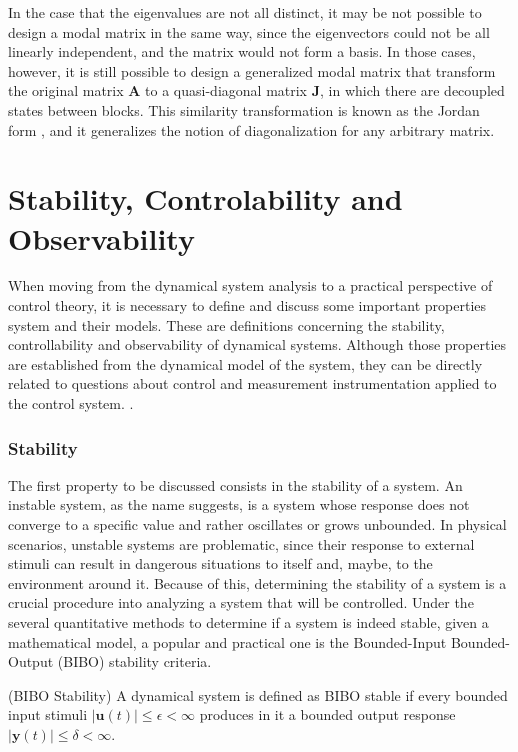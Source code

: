 \documentclass[a4paper,11pt]{book}
\numberwithin{figure}{chapter}
\numberwithin{equation}{chapter}
\numberwithin{table}{chapter}
\theoremstyle{definition}
\newtheorem{definition}{Definition}[chapter]
\newcounter{boxed-theorem}
\newcounter{boxed-definition}
\newenvironment{boxed-definition}[1]
{\colorlet{shadecolor}{pastelYellow!15} \begin{shaded} \begin{definition}{#1}}
{\end{definition} \end{shaded}}
\newcounter{boxed-example}
\begin{document}
In the case that the eigenvalues are not all distinct, it may be not possible to design a modal matrix in the same way, since the eigenvectors could not be all linearly independent, and the matrix would not form a basis. In those cases, however, it is still possible to design a generalized modal matrix that transform the original matrix $\bm{A}$ to a quasi-diagonal matrix $\bm{J}$, in which there are decoupled states between blocks. This similarity transformation is known as the Jordan form \cite{Strang:2016}, and it generalizes the notion of diagonalization for any arbitrary matrix.

\section{Stability, Controlability and Observability}

When moving from the dynamical system analysis to a practical perspective of control theory, it is necessary to define and discuss some important properties system and their models. These are definitions concerning the stability, controllability and observability of dynamical systems. Although those properties are established from the dynamical model of the system, they can be directly related to questions about control and measurement instrumentation applied to the control system. .

\subsubsection{Stability}

The first property to be discussed consists in the stability of a system. An instable system, as the name suggests, is a system whose response does not converge to a specific value and rather oscillates or grows unbounded. In physical scenarios, unstable systems are problematic, since their response to external stimuli can result in dangerous situations to itself and, maybe, to the environment around it. Because of this, determining the stability of a system is a crucial procedure into analyzing a system that will be controlled. Under the several quantitative methods to determine if a system is indeed stable, given a mathematical model, a popular and practical one is the Bounded-Input Bounded-Output (BIBO) stability criteria.

\begin{boxed-definition}{(BIBO Stability)} \label{def:BIBOStab}
    A dynamical system is defined as BIBO stable if every bounded input stimuli $| \bm{u}(t) | \leq \epsilon < \infty$ produces in it a bounded output response $| \bm{y}(t) | \leq \delta < \infty$.
\end{boxed-definition}
\end{document}
